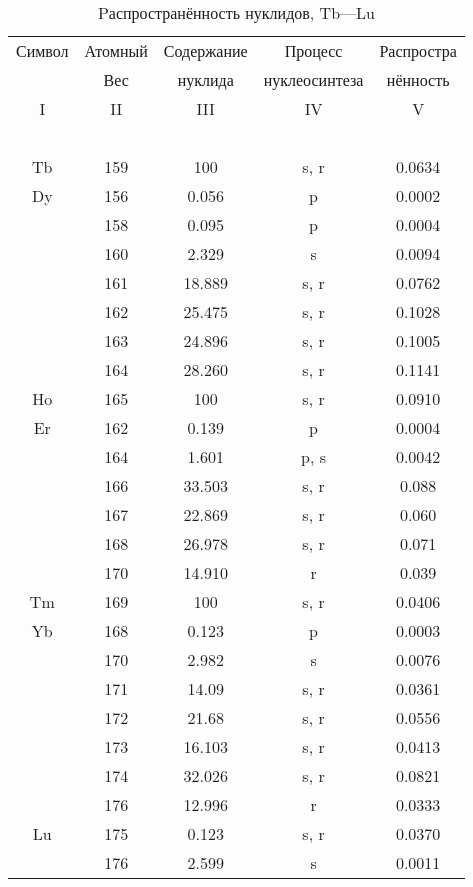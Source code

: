 \documentclass[a5paper,openany]{book}
\begin{document}
\begin{table}[h!]
	{\small
		\begin{tabular}{ccccc}
			Символ  & Атомный &  Содержание  & Процесс & Распростра   \\
			~ & Вес &  нуклида  &  нуклеосинтеза  & нённость  \\
			\hline 
			I & II &  III  & IV & V \\
			\hline 
			~ & ~ & ~ & ~ & ~  \\
			Tb & 159 & 100 & s, r & 0.0634 \\ [1mm]
			Dy & 156 & 0.056 & p & 0.0002 \\ [1mm]
			& 158 & 0.095 & p & 0.0004 \\ [1mm] 
			& 160 &  2.329 & s & 0.0094 \\ [1mm]  			
			& 161 & 18.889 & s, r & 0.0762 \\ [1mm]	
			& 162 & 25.475 & s, r & 0.1028 \\ [1mm] 
			& 163 &  24.896 & s, r & 0.1005 \\ [1mm]  	
			& 164 &  28.260 & s, r & 0.1141 \\ [1mm]  	
			Ho & 165 & 100 & s, r & 0.0910 \\ [1mm]
			Er & 162 & 0.139 & p & 0.0004 \\ [1mm]
			& 164 & 1.601 & p, s & 0.0042 \\ [1mm] 
			& 166 &  33.503 & s, r & 0.088 \\ [1mm]  			
			& 167 & 22.869 & s, r & 0.060 \\ [1mm]	
			& 168 &  26.978 & s, r & 0.071 \\ [1mm]  	
			& 170 &  14.910 & r & 0.039 \\ [1mm]  
			Tm & 169 & 100 & s, r & 0.0406 \\ [1mm]
			Yb & 168 & 0.123 & p & 0.0003 \\ [1mm]
			& 170 & 2.982 & s & 0.0076 \\ [1mm] 
			& 171 &  14.09 & s, r & 0.0361 \\ [1mm]  			
			& 172 & 21.68 & s, r & 0.0556 \\ [1mm]	
			& 173 &  16.103 & s, r & 0.0413 \\ [1mm]  	
			& 174 &  32.026 & s, r & 0.0821 \\ [1mm] 
			& 176 &  12.996 & r & 0.0333 \\ [1mm]  
			Lu & 175 & 0.123 & s, r & 0.0370 \\ [1mm]
			& 176 & 2.599 & s & 0.0011 \\ [1mm] 
			\hline 
		\end{tabular}
	}
	\caption{Pаспространённость нуклидов, Tb---Lu}
	\label{t:AbudanceSolarTbLu}
\end{table}
\end{document}
